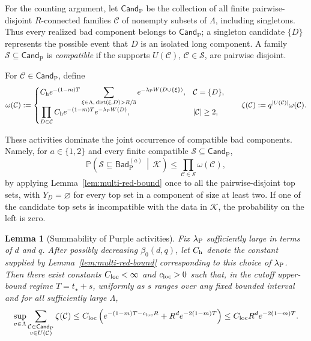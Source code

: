 \documentclass[letterpaper,11pt,reqno]{amsart}
\newtheorem{lemma}[thm]{Lemma}
\theoremstyle{definition}
\begin{document}
For the counting argument, let \(\mathsf{Cand}_{\mathrm P}\) be the collection
of all finite pairwise-disjoint \(R\)-connected families \(\mathcal C\) of
nonempty subsets of \(\Lambda\), including singletons. Thus every realized bad
component belongs to \(\mathsf{Cand}_{\mathrm P}\); a singleton candidate
\(\{D\}\) represents the possible event that \(D\) is an isolated long
component. A family
\(\mathcal S\subseteq\mathsf{Cand}_{\mathrm P}\) is \emph{compatible} if the
supports \(U(\mathcal C)\), \(\mathcal C\in\mathcal S\), are pairwise
disjoint.


For \(\mathcal C\in\mathsf{Cand}_{\mathrm P}\), define
\[
\omega(\mathcal C)
:=
\begin{cases}
\displaystyle
C_{\rm h}e^{-(1-m)T} \sum_{\substack{\xi\in\Lambda,\,
                   \operatorname{dist}(\xi,D)>R/3}}
e^{-\lambda_{\rm P}W(D\cup\{\xi\})},
&\mathcal C=\{D\},\\[4mm]
\displaystyle
\prod_{D\in\mathcal C}
 C_{\rm h}e^{-(1-m)T}e^{-\lambda_{\rm P}W(D)},
&|\mathcal C|\ge2,
\end{cases}
\qquad
\zeta(\mathcal C):=q^{|U(\mathcal C)|}\omega(\mathcal C).
\]

These activities dominate the joint occurrence of compatible bad
components. Namely, for \(a\in\{1,2\}\) and every finite compatible
\(\mathcal S\subseteq\mathsf{Cand}_{\mathrm P}\),
\begin{equation}
\label{eq:purple-component-domination}
\mathbb P\left(
        \mathcal S\subseteq\mathsf{Bad}_{\mathrm P}^{(a)}
        \,\middle|\,\mathcal K
\right)
\le
\prod_{\mathcal C\in\mathcal S}\omega(\mathcal C),
\end{equation}
by applying Lemma~\ref{lem:multi-red-bound} once to all the
pairwise-disjoint top sets, with \(Y_D=\varnothing\) for every top set in a component of size at least two. If one of the candidate top sets is
incompatible with the data in \(\mathcal K\), the probability on the left is
zero.

\begin{lemma}[Summability of Purple activities]
\label{lem:p-local-activity}
Fix \(\lambda_{\rm P}\) sufficiently large in terms of \(d\) and \(q\).
After possibly decreasing \(\beta_0(d,q)\), let \(C_{\rm h}\) denote the
constant supplied by Lemma~\ref{lem:multi-red-bound} corresponding to
this choice of \(\lambda_{\rm P}\). Then there exist constants
\(C_{\rm loc}<\infty\) and \(c_{\rm loc}>0\) such that, in the cutoff
upper-bound regime \(T=t_\star+s\), uniformly as \(s\) ranges over any
fixed bounded interval and for all sufficiently large \(\Lambda\),
\[
        \sup_{v\in\Lambda}
        \sum_{\substack{\mathcal C\in\mathsf{Cand}_{\mathrm P}\\
                        v\in U(\mathcal C)}}
        \zeta(\mathcal C)
        \le
        C_{\rm loc}
        \left(
        e^{-(1-m)T-c_{\rm loc}R}
        +R^d e^{-2(1-m)T}
        \right)
        \le
        C_{\rm loc}R^d e^{-2(1-m)T}.
\]
\end{lemma}
\end{document}
